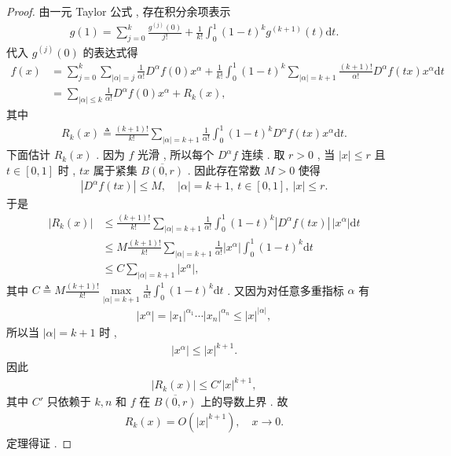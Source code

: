 \documentclass[../../main.tex]{subfiles}
\begin{document}
\begin{proof}
由一元 Taylor 公式 , 存在积分余项表示
\begin{align*}
g(1)=\sum\limits_{j=0}^k\frac{g^{(j)}(0)}{j!}+\frac{1}{k!}\int_0^1(1-t)^kg^{(k+1)}(t)\mathrm{d}t.
\end{align*}
代入 \(g^{(j)}(0)\) 的表达式得
\begin{align*}
f(x)
&=\sum\limits_{j=0}^k\sum\limits_{|\alpha|=j}\frac{1}{\alpha!}D^\alpha f(0)x^\alpha
+\frac{1}{k!}\int_0^1(1-t)^k\sum\limits_{|\alpha|=k+1}\frac{(k+1)!}{\alpha!}D^\alpha f(tx)x^\alpha\mathrm{d}t\\
&=\sum\limits_{|\alpha|\leqslant k}\frac{1}{\alpha!}D^\alpha f(0)x^\alpha+R_k(x),
\end{align*}
其中
\begin{align*}
R_k(x)\triangleq\frac{(k+1)!}{k!}\sum\limits_{|\alpha|=k+1}\frac{1}{\alpha!}\int_0^1(1-t)^kD^\alpha f(tx)x^\alpha\mathrm{d}t.
\end{align*}
下面估计 \(R_k(x)\) . 因为 \(f\) 光滑 , 所以每个 \(D^\alpha f\) 连续 . 取 \(r>0\) , 当 \(|x|\leqslant r\) 且 \(t\in[0,1]\) 时 , \(tx\) 属于紧集 \(\overline{B(0,r)}\) . 因此存在常数 \(M>0\) 使得
\begin{align*}
|D^\alpha f(tx)|\leqslant M,\quad |\alpha|=k+1,\ t\in[0,1],\ |x|\leqslant r.
\end{align*}
于是
\begin{align*}
|R_k(x)|
&\leqslant\frac{(k+1)!}{k!}\sum\limits_{|\alpha|=k+1}\frac{1}{\alpha!}\int_0^1(1-t)^k|D^\alpha f(tx)|\,|x^\alpha|\mathrm{d}t\\
&\leqslant M\frac{(k+1)!}{k!}\sum\limits_{|\alpha|=k+1}\frac{1}{\alpha!}|x^\alpha|\int_0^1(1-t)^k\mathrm{d}t\\
&\leqslant C\sum\limits_{|\alpha|=k+1}|x^\alpha|,
\end{align*}
其中 \(C\triangleq M\frac{(k+1)!}{k!}\max\limits_{|\alpha|=k+1}\frac{1}{\alpha!}\int_0^1(1-t)^k\mathrm{d}t\) . 又因为对任意多重指标 \(\alpha\) 有
\begin{align*}
|x^\alpha|=|x_1|^{\alpha_1}\cdots|x_n|^{\alpha_n}\leqslant |x|^{|\alpha|},
\end{align*}
所以当 \(|\alpha|=k+1\) 时 ,
\begin{align*}
|x^\alpha|\leqslant |x|^{k+1}.
\end{align*}
因此
\begin{align*}
|R_k(x)|\leqslant C'|x|^{k+1},
\end{align*}
其中 \(C'\) 只依赖于 \(k,n\) 和 \(f\) 在 \(\overline{B(0,r)}\) 上的导数上界 . 故
\begin{align*}
R_k(x)=O(|x|^{k+1}),\quad x\to0.
\end{align*}
定理得证 .
\end{proof}
\end{document}
